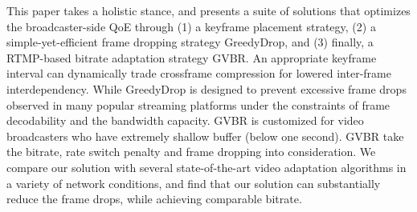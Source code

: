 \begin{eabstract}
This paper takes a holistic stance, and presents a suite of
solutions that optimizes the broadcaster-side QoE through (1)
a keyframe placement strategy,
(2) a simple-yet-efficient frame dropping strategy GreedyDrop, and (3) finally, a RTMP-based bitrate adaptation
strategy GVBR.
An appropriate keyframe interval can dynamically trade crossframe
compression for lowered inter-frame interdependency. While GreedyDrop is designed to prevent
excessive frame drops observed in many popular streaming
platforms under the constraints of frame decodability and the bandwidth capacity. GVBR is customized for video broadcasters who have extremely
shallow buffer (below one second). GVBR take the bitrate, rate switch penalty and frame dropping into consideration. We compare our solution with several state-of-the-art video adaptation algorithms in a variety of network conditions, and find
that our solution can substantially reduce the frame drops, while achieving comparable
bitrate.
\end{eabstract}

